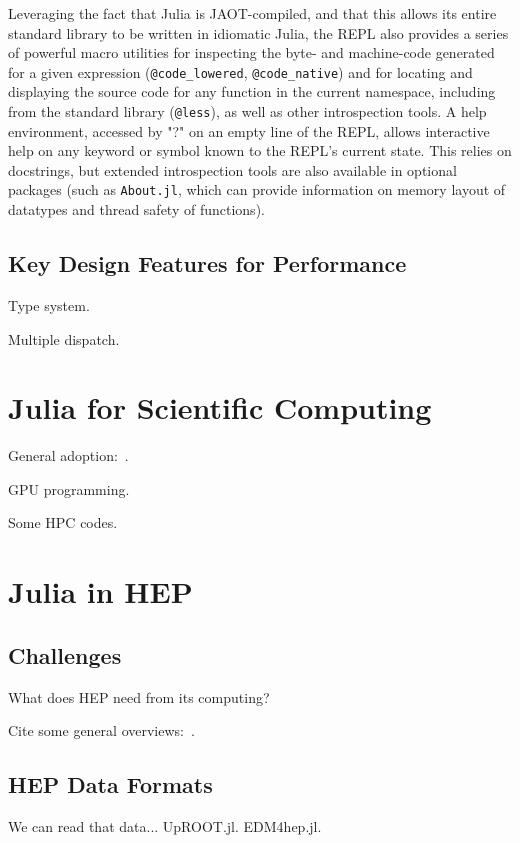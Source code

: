\documentclass{webofc}
\begin{document}
Leveraging the fact that Julia is JAOT-compiled, and that this allows its entire standard library to be written in idiomatic Julia, the REPL also provides
a series of powerful macro utilities for inspecting the byte- and machine-code generated for a given expression (\verb$@code_lowered$, \verb$@code_native$) and
for locating and displaying the source code for any function in the current namespace, including from the standard library (\verb$@less$), as well as other introspection
tools.
A help environment, accessed by "?" on an empty line of the REPL, allows interactive help on any keyword or symbol known to the REPL's current state. This relies 
on docstrings, but extended introspection tools are also available in optional packages (such as \texttt{About.jl}, which can provide information 
on memory layout of datatypes and thread safety of functions).

\subsection{Key Design Features for Performance}

Type system.

Multiple dispatch.

\section{Julia for Scientific Computing}

General adoption:~\cite{perkel-julia-science}.

GPU programming.

Some HPC codes.

\section{Julia in HEP}

\subsection{Challenges}

What does HEP need from its computing?

Cite some general overviews:~\cite{Stanitzki:2020bnx,eschle2023potential}.

\subsection{HEP Data Formats}

We can read that data... UpROOT.jl. EDM4hep.jl.
\end{document}
